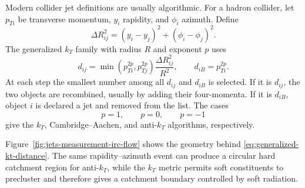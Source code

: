 Modern collider jet definitions are usually algorithmic.  For a hadron
collider, let \(p_{Ti}\) be transverse momentum, \(y_i\) rapidity, and
\(\phi_i\) azimuth.  Define
\[
  \Delta R_{ij}^2=(y_i-y_j)^2+(\phi_i-\phi_j)^2.
\]
The generalized \(k_T\) family with radius \(R\) and exponent \(p\) uses
\begin{equation}
  d_{ij}
  =
  \min(p_{Ti}^{2p},p_{Tj}^{2p})
  \frac{\Delta R_{ij}^2}{R^2},
  \qquad
  d_{iB}=p_{Ti}^{2p}.
  \label{eq:generalized-kt-distance}
\end{equation}
At each step the smallest number among all \(d_{ij}\) and \(d_{iB}\) is
selected.  If it is \(d_{ij}\), the two objects are recombined, usually by
adding their four-momenta.  If it is \(d_{iB}\), object \(i\) is declared a
jet and removed from the list.  The cases
\[
  p=1,\qquad p=0,\qquad p=-1
\]
give the \(k_T\), Cambridge--Aachen, and anti-\(k_T\) algorithms,
respectively.

Figure~\ref{fig:jets-measurement-irc-flow} shows the geometry behind
\eqref{eq:generalized-kt-distance}.  The same rapidity--azimuth event can
produce a circular hard catchment region for anti-\(k_T\), while the \(k_T\)
metric permits soft constituents to precluster and therefore gives a
catchment boundary controlled by soft radiation.

